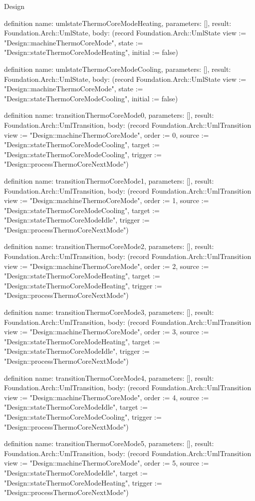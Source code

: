 \begin{lexlean}{Design}
\begin{semanticmodule}
definition{
  name: umlstateThermoCoreModeHeating,
  parameters: [],
  result: Foundation.Arch::UmlState,
  body: (record Foundation.Arch::UmlState {view := "Design::machineThermoCoreMode", state := "Design::stateThermoCoreModeHeating", initial := false})
}

definition{
  name: umlstateThermoCoreModeCooling,
  parameters: [],
  result: Foundation.Arch::UmlState,
  body: (record Foundation.Arch::UmlState {view := "Design::machineThermoCoreMode", state := "Design::stateThermoCoreModeCooling", initial := false})
}

definition{
  name: transitionThermoCoreMode0,
  parameters: [],
  result: Foundation.Arch::UmlTransition,
  body: (record Foundation.Arch::UmlTransition {view := "Design::machineThermoCoreMode", order := 0, source := "Design::stateThermoCoreModeCooling", target := "Design::stateThermoCoreModeCooling", trigger := "Design::processThermoCoreNextMode"})
}

definition{
  name: transitionThermoCoreMode1,
  parameters: [],
  result: Foundation.Arch::UmlTransition,
  body: (record Foundation.Arch::UmlTransition {view := "Design::machineThermoCoreMode", order := 1, source := "Design::stateThermoCoreModeCooling", target := "Design::stateThermoCoreModeIdle", trigger := "Design::processThermoCoreNextMode"})
}

definition{
  name: transitionThermoCoreMode2,
  parameters: [],
  result: Foundation.Arch::UmlTransition,
  body: (record Foundation.Arch::UmlTransition {view := "Design::machineThermoCoreMode", order := 2, source := "Design::stateThermoCoreModeHeating", target := "Design::stateThermoCoreModeHeating", trigger := "Design::processThermoCoreNextMode"})
}

definition{
  name: transitionThermoCoreMode3,
  parameters: [],
  result: Foundation.Arch::UmlTransition,
  body: (record Foundation.Arch::UmlTransition {view := "Design::machineThermoCoreMode", order := 3, source := "Design::stateThermoCoreModeHeating", target := "Design::stateThermoCoreModeIdle", trigger := "Design::processThermoCoreNextMode"})
}

definition{
  name: transitionThermoCoreMode4,
  parameters: [],
  result: Foundation.Arch::UmlTransition,
  body: (record Foundation.Arch::UmlTransition {view := "Design::machineThermoCoreMode", order := 4, source := "Design::stateThermoCoreModeIdle", target := "Design::stateThermoCoreModeCooling", trigger := "Design::processThermoCoreNextMode"})
}

definition{
  name: transitionThermoCoreMode5,
  parameters: [],
  result: Foundation.Arch::UmlTransition,
  body: (record Foundation.Arch::UmlTransition {view := "Design::machineThermoCoreMode", order := 5, source := "Design::stateThermoCoreModeIdle", target := "Design::stateThermoCoreModeHeating", trigger := "Design::processThermoCoreNextMode"})
}


\end{semanticmodule}
\end{lexlean}
